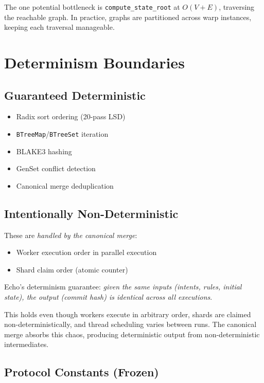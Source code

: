 The one potential bottleneck is \texttt{compute\_state\_root} at $O(V + E)$, traversing the
reachable graph. In practice, graphs are partitioned across warp instances, keeping each
traversal manageable.

\section{Determinism Boundaries}

\subsection{Guaranteed Deterministic}

\begin{itemize}
  \item Radix sort ordering (20-pass LSD)
  \item \texttt{BTreeMap}/\texttt{BTreeSet} iteration
  \item BLAKE3 hashing
  \item GenSet conflict detection
  \item Canonical merge deduplication
\end{itemize}

\subsection{Intentionally Non-Deterministic}

These are \emph{handled by the canonical merge}:
\begin{itemize}
  \item Worker execution order in parallel execution
  \item Shard claim order (atomic counter)
\end{itemize}

Echo's determinism guarantee: \emph{given the same inputs (intents, rules, initial state),
the output (commit hash) is identical across all executions}.

This holds even though workers execute in arbitrary order, shards are claimed
non-deterministically, and thread scheduling varies between runs. The canonical merge
absorbs this chaos, producing deterministic output from non-deterministic intermediates.

\subsection{Protocol Constants (Frozen)}

